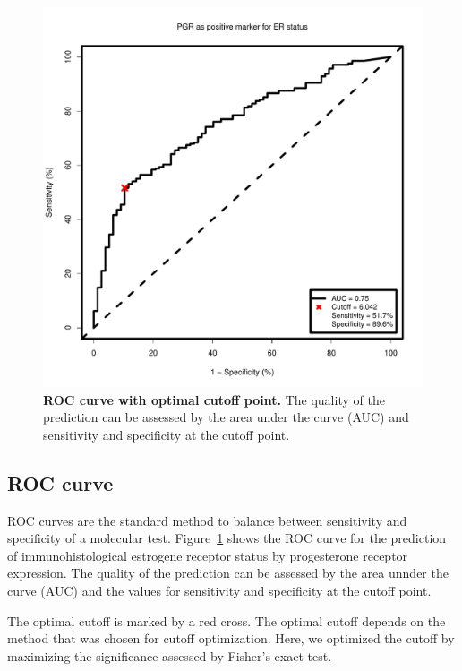 \documentclass[12pt, a4paper]{article}
\begin{document}
\newpage

\begin{figure}[t]
\centering
\includegraphics{Cutoff_Finder_manual-004}
\caption{\textbf{ROC curve with optimal cutoff point.}
The quality of the prediction can be assessed by the area under the curve (AUC) and sensitivity and specificity at the cutoff point.}
\label{fig:roc}
\end{figure}

\subsection{ROC curve}

ROC curves are the standard method to balance between sensitivity and specificity of a molecular test.
Figure~\ref{fig:roc} shows the ROC curve for the prediction of immunohistological estrogene receptor status by progesterone receptor expression.
The quality of the prediction can be assessed by the area unnder the curve (AUC) and the values for sensitivity and specificity at the cutoff point.

The optimal cutoff is marked by a red cross.
The optimal cutoff depends on the method that was chosen for cutoff optimization.
Here, we optimized the cutoff by maximizing the significance assessed by Fisher's exact test.
\end{document}
